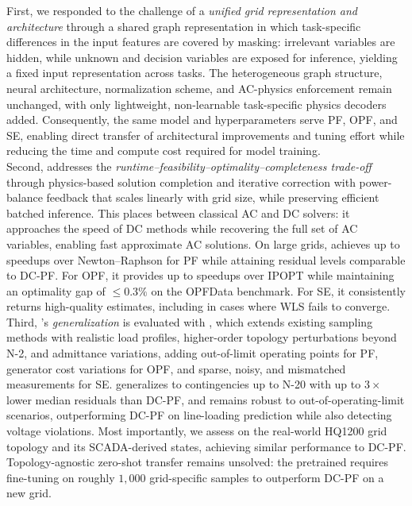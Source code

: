 First, we responded to the challenge of a \textit{unified grid representation and architecture} through a shared graph representation in which task-specific differences in the input features are covered by masking: irrelevant variables are hidden, while unknown and decision variables are exposed for inference, yielding a fixed input representation across tasks. The heterogeneous graph structure, neural architecture, normalization scheme, and AC-physics enforcement remain unchanged, with only lightweight, non-learnable task-specific physics decoders added. Consequently, the same model and hyperparameters serve PF, OPF, and SE, enabling direct transfer of architectural improvements and tuning effort while reducing the time and compute cost required for model training.\\

Second, \genco addresses the \textit{runtime--feasibility--optimality--completeness trade-off} through physics-based solution completion and iterative correction with power-balance feedback that scales linearly with grid size, while preserving efficient batched inference. This places \genco between classical AC and DC solvers: it approaches the speed of DC methods while recovering the full set of AC variables, enabling fast approximate AC solutions. On large grids, \genco achieves up to \maxpfspeedups speedups over Newton--Raphson for PF while attaining residual levels comparable to DC-PF. For OPF, it provides up to \maxopfspeedups speedups over IPOPT while maintaining an optimality gap of $\leq 0.3\%$ on the OPFData benchmark. For SE, it consistently returns high-quality estimates, including in cases where WLS fails to converge.\\

Third, \genco's \textit{generalization} is evaluated with \datakit, which extends existing sampling methods with realistic load profiles, higher-order topology perturbations beyond N-2, and admittance variations, adding out-of-limit operating points for PF, generator cost variations for OPF, and sparse, noisy, and mismatched measurements for SE. \genco generalizes to contingencies up to N-20 with up to $3\times$ lower median residuals than DC-PF, and remains robust to out-of-operating-limit scenarios, outperforming DC-PF on line-loading prediction while also detecting voltage violations. Most importantly, we assess \genco on the real-world HQ1200 grid topology and its SCADA-derived states, achieving similar performance to DC-PF. Topology-agnostic zero-shot transfer remains unsolved: the pretrained \genco requires fine-tuning on roughly $1{,}000$ grid-specific samples to outperform DC-PF on a new grid.\\

